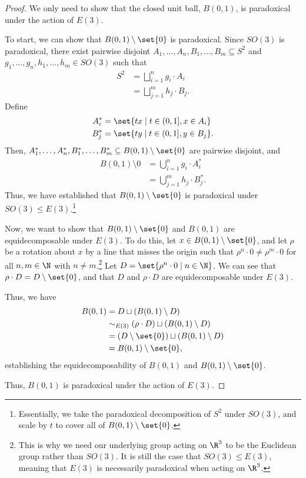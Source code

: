 \documentclass[10pt]{mypackage}
\begin{document}
\begin{proof}
  We only need to show that the closed unit ball, $B(0,1)$, is paradoxical under the action of $E(3)$.\newline

  To start, we can show that $B(0,1)\setminus \set{0}$ is paradoxical. Since $SO(3)$ is paradoxical, there exist pairwise disjoint $A_1,\dots,A_n,B_1,\dots,B_m\subseteq S^2$ and $g_1,\dots,g_n,h_1,\dots,h_m\in SO(3)$ such that
  \begin{align*}
    S^2 &= \bigsqcup_{i=1}^{n}g_i\cdot A_i\\
        &= \bigsqcup_{j=1}^{m}h_j\cdot B_j.
  \end{align*}
  Define
  \begin{align*}
    A_i^{\ast} &= \set{tx\mid t\in (0,1],x\in A_i}\\
    B_j^{\ast} &= \set{ty\mid t\in (0,1],y\in B_j}.
  \end{align*}
  Then, $A_1^{\ast},\dots,A_n^{\ast},B_1^{\ast},\dots,B_m^{\ast}\subseteq B(0,1)\setminus \set{0}$ are pairwise disjoint, and
  \begin{align*}
    B(0,1)\setminus {0} &= \bigcup_{i=1}^{n}g_i\cdot A_i^{\ast}\\
           &= \bigcup_{j=1}^{m}h_j\cdot B_j^{\ast}.
  \end{align*}
  Thus, we have established that $B(0,1)\setminus \set{0}$ is paradoxical under $SO(3)\leq E(3)$.\footnote{Essentially, we take the paradoxical decomposition of $S^2$ under $SO(3)$, and scale by $t$ to cover all of $B(0,1)\setminus \set{0}$.}\newline

  Now, we want to show that $B(0,1)\setminus \set{0}$ and $B(0,1)$ are equidecomposable under $E(3)$. To do this, let $x \in B(0,1)\setminus \set{0}$, and let $\rho$ be a rotation about $x$ by a line that misses the origin such that $\rho^{n}\cdot 0 \neq \rho^{m}\cdot 0$ for all $n,m\in \N$ with $n\neq m$.\footnote{This is why we need our underlying group acting on $\R^3$ to be the Euclidean group rather than $SO(3)$. It is still the case that $SO(3)\leq E(3)$, meaning that $E(3)$ is necessarily paradoxical when acting on $\R^3$.} Let $D = \set{\rho^{n}\cdot 0\mid n\in\N}$. We can see that $\rho\cdot D = D\setminus \set{0}$, and that $D$ and $\rho\cdot D$ are equidecomposable under $E(3)$.\newline

  Thus, we have
  \begin{align*}
    B(0,1) &= D\sqcup \left(B(0,1)\setminus D\right)\\
           &\sim_{E(3)} \left(\rho\cdot D\right)\sqcup \left(B(0,1)\setminus D\right)\\
           &= \left(D\setminus \set{0}\right) \sqcup \left(B(0,1)\setminus D\right)\\
           &= B(0,1)\setminus \set{0},
  \end{align*}
  establishing the equidecomposability of $B(0,1)$ and $B(0,1)\setminus \set{0}$.\newline

  Thus, $B(0,1)$ is paradoxical under the action of $E(3)$.
\end{proof}
\end{document}

